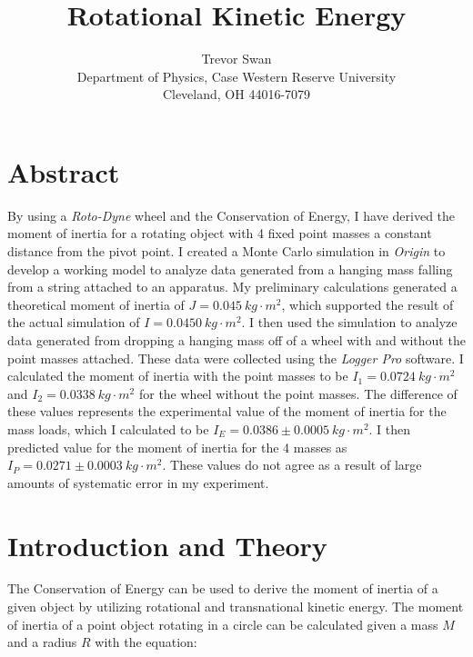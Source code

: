 \documentclass[12pt]{article}
\title{Rotational Kinetic Energy}
\author{Trevor Swan \\
Department of Physics, Case Western Reserve University \\
Cleveland, OH 44016-7079}
\date{}
\begin{document}
\pagestyle{fancy}
\fancyhf{}

\maketitle
\thispagestyle{fancy}
\renewcommand{\headrulewidth}{0pt}

\fancyfoot[C]{\thepage}

\section{Abstract}
By using a \textit{Roto-Dyne} wheel and the Conservation of Energy, I have derived  the moment of inertia for a rotating object with 4 fixed point masses a constant distance from the pivot point. I created a Monte Carlo simulation in \textit{Origin} to develop a working model to analyze data generated from a hanging mass falling from a string attached to an apparatus. My preliminary calculations generated a theoretical moment of inertia of $J=0.045\ kg\cdot m^2$, which supported the result of the actual simulation of $I=0.0450\ kg\cdot m^2$. I then used the simulation to analyze data generated from dropping a hanging mass off of a wheel with and without the point masses attached. These data were collected using the \textit{Logger Pro} software. I calculated the moment of inertia with the point masses to be $I_1=0.0724\ kg\cdot m^2$ and $I_2=0.0338\ kg\cdot m^2$ for the wheel without the point masses. The difference of these values represents the experimental value of the moment of inertia for the mass loads, which I calculated to be $I_E=0.0386\pm0.0005\ kg\cdot m^2$. I then predicted value for the moment of inertia for the 4 masses as $I_P=0.0271\pm0.0003\ kg\cdot m^2$. These values do not agree as a result of large amounts of systematic error in my experiment.


\section{Introduction and Theory}
The Conservation of Energy can be used to derive the moment of inertia of a given object by utilizing rotational and transnational kinetic energy. The moment of inertia of a point object rotating in a circle can be calculated given a mass $M$ and a radius $R$ with the equation: \par
\end{document}
